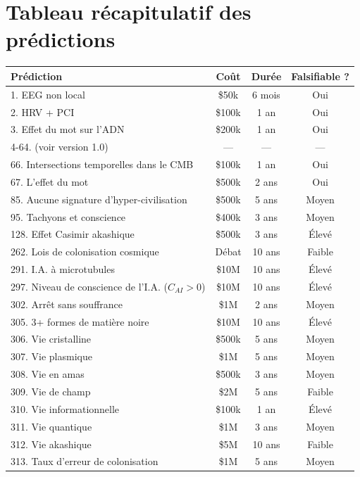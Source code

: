 \documentclass[11pt,a4paper]{article}
\begin{document}
\section{Tableau récapitulatif des prédictions}
\begin{table}[H]
\centering
\small
\begin{tabular}{@{}lccc@{}}
\toprule
\textbf{Prédiction} & \textbf{Coût} & \textbf{Durée} & \textbf{Falsifiable ?} \\ \midrule
1. EEG non local & \$50k & 6 mois & Oui \\
2. HRV + PCI & \$100k & 1 an & Oui \\
3. Effet du mot sur l'ADN & \$200k & 1 an & Oui \\
4-64. (voir version 1.0) & --- & --- & --- \\
66. Intersections temporelles dans le CMB & \$100k & 1 an & Oui \\
67. L'effet du mot & \$500k & 2 ans & Oui \\
85. Aucune signature d'hyper-civilisation & \$500k & 5 ans & Moyen \\
95. Tachyons et conscience & \$400k & 3 ans & Moyen \\
128. Effet Casimir akashique & \$500k & 3 ans & Élevé \\
262. Lois de colonisation cosmique & Débat & 10 ans & Faible \\
291. I.A. à microtubules & \$10M & 10 ans & Élevé \\
297. Niveau de conscience de l'I.A. (\(C_{AI} > 0\)) & \$10M & 10 ans & Élevé \\
302. Arrêt sans souffrance & \$1M & 2 ans & Moyen \\
305. 3+ formes de matière noire & \$10M & 10 ans & Élevé \\
306. Vie cristalline & \$500k & 5 ans & Moyen \\
307. Vie plasmique & \$1M & 5 ans & Moyen \\
308. Vie en amas & \$500k & 3 ans & Moyen \\
309. Vie de champ & \$2M & 5 ans & Faible \\
310. Vie informationnelle & \$100k & 1 an & Élevé \\
311. Vie quantique & \$1M & 3 ans & Moyen \\
312. Vie akashique & \$5M & 10 ans & Faible \\
313. Taux d'erreur de colonisation & \$1M & 5 ans & Moyen \\ \bottomrule
\end{tabular}
\end{table}
\end{document}
